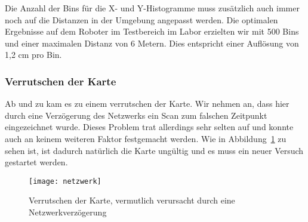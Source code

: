 Die Anzahl der Bins für die X- und Y-Histogramme muss zusätzlich auch immer noch auf die Distanzen in der Umgebung angepasst werden. Die optimalen Ergebnisse auf dem Roboter im Testbereich im Labor erzielten wir mit 500 Bins und einer maximalen Distanz von 6 Metern. Dies entspricht einer Auflösung von 1,2 cm pro Bin.

\subsubsection{Verrutschen der Karte}

Ab und zu kam es zu einem verrutschen der Karte. Wir nehmen an, dass hier durch eine Verzögerung des Netzwerks ein Scan zum falschen Zeitpunkt eingezeichnet wurde. Dieses Problem trat allerdings sehr selten auf und konnte auch an keinem weiteren Faktor festgemacht werden. Wie in Abbildung~\ref{fig:netzwerk} zu sehen ist, ist dadurch natürlich die Karte ungültig und es muss ein neuer Versuch gestartet werden.

\begin{figure}
	\centering
	\texttt{[image: netzwerk]}
	\caption{Verrutschen der Karte, vermutlich verursacht durch eine Netzwerkverzögerung}
	\label{fig:netzwerk}
\end{figure}